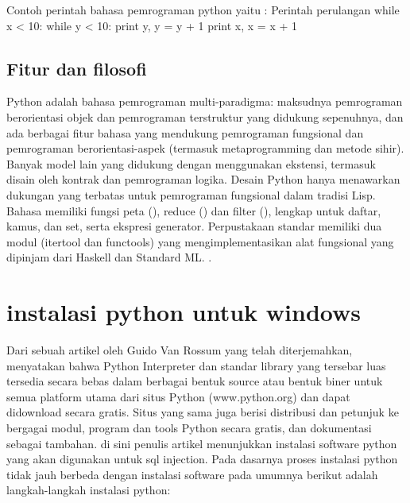       Contoh perintah bahasa pemrograman python yaitu :
      Perintah perulangan
      while x < 10: 
      	   while y < 10: 
		print y, 
		y = y + 1 
	   print x,
	   x = x + 1

      
\subsection {Fitur dan filosofi}
	Python adalah bahasa pemrograman multi-paradigma: maksudnya pemrograman berorientasi objek dan pemrograman terstruktur 
	yang didukung sepenuhnya, dan ada berbagai fitur bahasa yang mendukung pemrograman fungsional dan pemrograman berorientasi-aspek
	(termasuk metaprogramming dan metode sihir). Banyak model lain yang didukung dengan menggunakan ekstensi, termasuk disain 
	oleh kontrak dan pemrograman logika. 
	Desain Python hanya menawarkan dukungan yang terbatas untuk pemrograman fungsional dalam tradisi Lisp. 
	Bahasa memiliki fungsi peta (), reduce () dan filter (), lengkap untuk daftar, kamus, dan set, serta ekspresi generator. 
	Perpustakaan standar memiliki dua modul (itertool dan functools) yang mengimplementasikan alat fungsional yang dipinjam 
	dari Haskell dan Standard ML. \cite {van2007python}.

\section {instalasi python untuk windows}

	Dari sebuah artikel oleh Guido Van Rossum yang telah diterjemahkan, menyatakan bahwa Python Interpreter dan standar library 
	yang tersebar luas tersedia secara bebas dalam berbagai bentuk source atau bentuk biner untuk semua platform utama dari situs 
	Python (www.python.org) dan dapat didownload secara gratis. Situs yang sama juga berisi distribusi dan petunjuk ke bergagai 
	modul, program dan tools Python secara gratis, dan dokumentasi sebagai tambahan. \cite {van1995python}
	di sini penulis artikel menunjukkan instalasi software python yang akan
	digunakan untuk sql injection. Pada dasarnya proses instalasi python tidak jauh berbeda dengan instalasi software pada umumnya
	berikut adalah langkah-langkah instalasi python:

